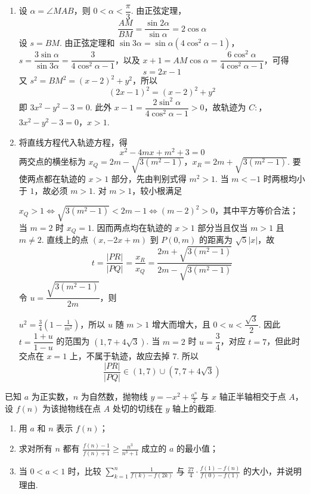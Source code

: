 \begin{solution}
\begin{enumerate}
\item 设 \(\alpha=\angle MAB\)，则 \(0<\alpha<\dfrac\pi3\). 由正弦定理，
\[
\frac{AM}{BM}=\frac{\sin2\alpha}{\sin\alpha}=2\cos\alpha
\]
设 \(s=BM\). 由正弦定理和 \(\sin3\alpha=\sin\alpha(4\cos^2\alpha-1)\)，
\(s=\dfrac{3\sin\alpha}{\sin3\alpha}=\dfrac{3}{4\cos^2\alpha-1}\)，以及
\(x+1=AM\cos\alpha=\dfrac{6\cos^2\alpha}{4\cos^2\alpha-1}\)，可得
\[
s=2x-1
\]
又 \(s^2=BM^2=(x-2)^2+y^2\)，所以
\[
(2x-1)^2=(x-2)^2+y^2
\]
即 \(3x^2-y^2-3=0\). 此外 \(x-1=\dfrac{2\sin^2\alpha}{4\cos^2\alpha-1}>0\)，故轨迹为
\(C:\)，\(3x^2-y^2-3=0\)，\(x>1\).
\item 将直线方程代入轨迹方程，得
\[
x^2-4mx+m^2+3=0
\]
两交点的横坐标为
\(x_Q=2m-\sqrt{3(m^2-1)}\)，\(x_R=2m+\sqrt{3(m^2-1)}\).
要使两点都在轨迹的 \(x>1\) 部分，先由判别式得 \(m^2>1\). 当 \(m<-1\) 时两根均小于 \(1\)，故必须 \(m>1\). 对 \(m>1\)，较小根满足

\(\displaystyle x_Q>1\Longleftrightarrow\sqrt{3(m^2-1)}<2m-1\Longleftrightarrow (m-2)^2>0\)，其中平方等价合法；当 \(m=2\) 时 \(x_Q=1\). 因而两点均在轨迹的 \(x>1\) 部分当且仅当 \(m>1\) 且 \(m\neq2\). 直线上的点 \((x,-2x+m)\) 到 \(P(0,m)\) 的距离为 \(\sqrt5|x|\)，故
\[
t=\frac{|PR|}{|PQ|}=\frac{x_R}{x_Q}
 =\frac{2m+\sqrt{3(m^2-1)}}{2m-\sqrt{3(m^2-1)}}
\]
令 \(u=\dfrac{\sqrt{3(m^2-1)}}{2m}\)，则

\(\displaystyle u^2=\frac34\left(1-\frac1{m^2}\right)\)，所以 \(u\) 随 \(m>1\) 增大而增大，且
\(0<u<\dfrac{\sqrt3}{2}\). 因此 \(t=\dfrac{1+u}{1-u}\) 的范围为
\(\left(1,7+4\sqrt3\right)\). 当 \(m=2\) 时 \(u=\dfrac34\)，对应 \(t=7\)，但此时交点在 \(x=1\) 上，不属于轨迹，故应去掉 \(7\). 所以
\[
\frac{|PR|}{|PQ|}\in(1,7)\cup(7,7+4\sqrt3)
\]
\end{enumerate}
\end{solution}

\begin{problem}
已知 \(a\) 为正实数，\(n\) 为自然数，抛物线 \(y = -x^{2} + \frac{a^{n}}{2}\) 与 \(x\) 轴正半轴相交于点 \(A\)，设 \(f(n)\) 为该抛物线在点 \(A\) 处切的切线在 \(y\) 轴上的截距.
\begin{enumerate}
\item 用 \(a\) 和 \(n\) 表示 \(f(n)\)；
\item 求对所有 \(n\) 都有 \(\frac{f(n) - 1}{f(n) + 1} \geqslant \frac{n^3}{n^3 + 1}\) 成立的 \(a\) 的最小值；
\item 当 \(0 < a < 1\) 时，比较 \(\sum_{k=1}^{n} \frac{1}{f(k) - f(2k)}\) 与 \(\frac{27}{4} \cdot \frac{f(1) - f(n)}{f(0) - f(1)}\) 的大小，并说明理由.
\end{enumerate}
\end{problem}

